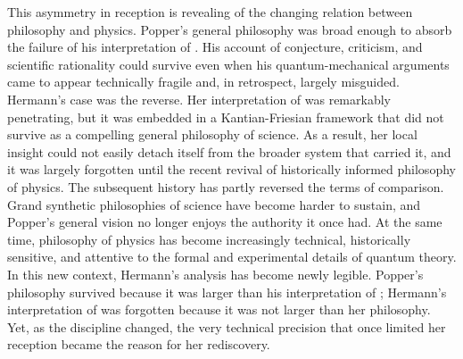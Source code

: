 This asymmetry in reception is revealing of the changing relation between philosophy and physics. Popper's general philosophy was broad enough to absorb the failure of his interpretation of \qm. His account of conjecture, criticism, and scientific rationality could survive even when his quantum-mechanical arguments came to appear technically fragile and, in retrospect, largely misguided. Hermann's case was the reverse. Her interpretation of \qm was remarkably penetrating, but it was embedded in a Kantian-Friesian framework that did not survive as a compelling general philosophy of science. As a result, her local insight could not easily detach itself from the broader system that carried it, and it was largely forgotten until the recent revival of historically informed philosophy of physics. The subsequent history has partly reversed the terms of comparison. Grand synthetic philosophies of science have become harder to sustain, and Popper's general vision no longer enjoys the authority it once had. At the same time, philosophy of physics has become increasingly technical, historically sensitive, and attentive to the formal and experimental details of quantum theory. In this new context, Hermann's analysis has become newly legible. Popper's philosophy survived because it was larger than his interpretation of \qm; Hermann's interpretation of \qm was forgotten because it was not larger than her philosophy. Yet, as the discipline changed, the very technical precision that once limited her reception became the reason for her rediscovery.




